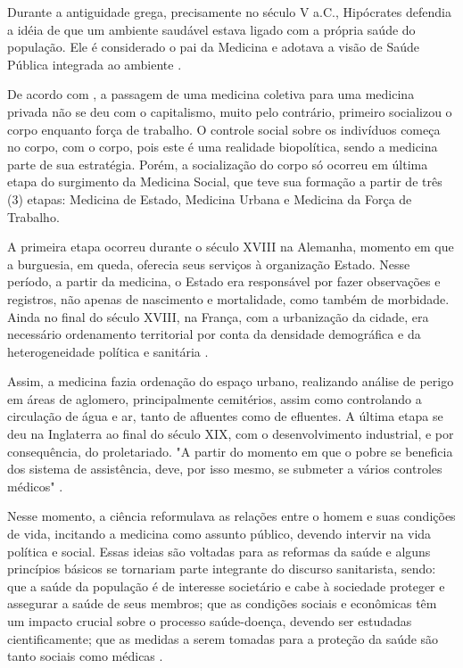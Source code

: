 \indent Durante a antiguidade grega, precisamente no século V a.C., Hipócrates defendia a idéia de que um ambiente saudável estava ligado com a própria saúde do população. Ele é considerado o pai da Medicina e adotava a visão de Saúde Pública integrada ao ambiente \cite{CFMVSaude}.

\indent De acordo com , a passagem de uma medicina coletiva para uma medicina privada não se deu com o capitalismo, muito pelo contrário, primeiro socializou o corpo enquanto força de trabalho. O controle social sobre os indivíduos começa no corpo, com o corpo, pois este é uma realidade biopolítica, sendo a medicina parte de sua estratégia. Porém, a socialização do corpo só ocorreu em última etapa do surgimento da Medicina Social, que teve sua formação a partir de três (3) etapas: Medicina de Estado, Medicina Urbana e Medicina da Força de Trabalho.

\indent A primeira etapa ocorreu durante o século XVIII na Alemanha, momento em que a burguesia, em queda, oferecia seus serviços à organização Estado. Nesse período, a partir da medicina, o Estado era responsável por fazer observações e registros, não apenas de nascimento e mortalidade, como também de morbidade. Ainda no final do século XVIII, na França, com a urbanização da cidade, era necessário ordenamento territorial por conta da densidade demográfica e da heterogeneidade política e sanitária \cite{Foucault1990Microfisica}.

\indent Assim, a medicina fazia ordenação do espaço urbano, realizando análise de perigo em áreas de aglomero, principalmente cemitérios, assim como controlando a circulação de água e ar, tanto de afluentes como de efluentes. A última etapa se deu na Inglaterra ao final do século XIX, com o desenvolvimento industrial, e por consequência, do proletariado. "A partir do momento em que o pobre se beneficia dos sistema de assistência, deve, por isso mesmo, se submeter a vários controles médicos" \cite{Foucault1990Microfisica}.

\indent Nesse momento, a ciência reformulava as relações entre o homem e suas condições de vida, incitando a medicina como assunto público, devendo intervir na vida política e social. Essas ideias são voltadas para as reformas da saúde e alguns princípios básicos se tornariam parte integrante do discurso sanitarista, sendo: que a saúde da população é de interesse societário e cabe à sociedade proteger e assegurar a saúde de seus membros; que as condições sociais e econômicas têm um impacto crucial sobre o processo saúde-doença, devendo ser estudadas cientificamente; que as medidas a serem tomadas para a proteção da saúde são tanto sociais como médicas \cite{TratadoSaudeColetiva}.

